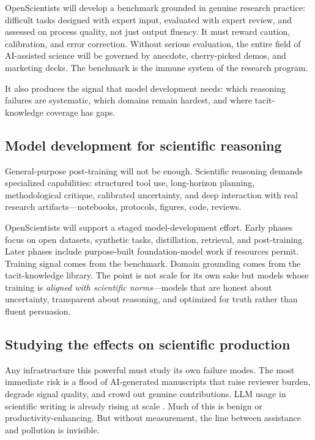 \documentclass[11pt]{article}
\begin{document}
OpenScientists will develop a benchmark grounded in genuine research practice: difficult tasks designed with expert input, evaluated with expert review, and assessed on process quality, not just output fluency. It must reward caution, calibration, and error correction. Without serious evaluation, the entire field of AI-assisted science will be governed by anecdote, cherry-picked demos, and marketing decks. The benchmark is the immune system of the research program.

It also produces the signal that model development needs: which reasoning failures are systematic, which domains remain hardest, and where tacit-knowledge coverage has gaps.

\subsection{Model development for scientific reasoning}

General-purpose post-training will not be enough. Scientific reasoning demands specialized capabilities: structured tool use, long-horizon planning, methodological critique, calibrated uncertainty, and deep interaction with real research artifacts---notebooks, protocols, figures, code, reviews.

OpenScientists will support a staged model-development effort. Early phases focus on open datasets, synthetic tasks, distillation, retrieval, and post-training. Later phases include purpose-built foundation-model work if resources permit. Training signal comes from the benchmark. Domain grounding comes from the tacit-knowledge library. The point is not scale for its own sake but models whose training is \emph{aligned with scientific norms}---models that are honest about uncertainty, transparent about reasoning, and optimized for truth rather than fluent persuasion.

\subsection{Studying the effects on scientific production}

Any infrastructure this powerful must study its own failure modes. The most immediate risk is a flood of AI-generated manuscripts that raise reviewer burden, degrade signal quality, and crowd out genuine contributions. LLM usage in scientific writing is already rising at scale \citep{liang2024llmpapers}. Much of this is benign or productivity-enhancing. But without measurement, the line between assistance and pollution is invisible.
\end{document}
